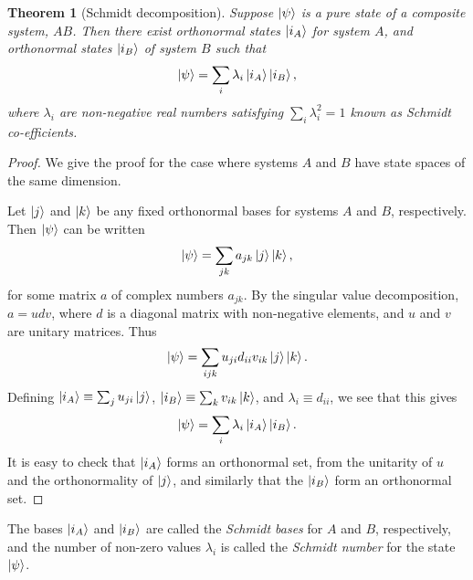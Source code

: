 \documentclass{article}
\newtheorem{theorem}{Theorem}
\numberwithin{theorem}{section}
\numberwithin{corollary}{section}
\numberwithin{postulate}{section}
\begin{document}
\begin{theorem}[Schmidt decomposition]
  Suppose $\ket{\psi}$ is a pure state of a composite system, $AB$. Then there
  exist orthonormal states $\ket{i_A}$ for system $A$, and orthonormal states
  $\ket{i_B}$ of system $B$ such that \[
    \ket{\psi} = \sum_i \lambda_i\ket{i_A}\ket{i_B},
  \] where $\lambda_i$ are non-negative real numbers satisfying $\sum_i
  \lambda_i^2 = 1$ known as \emph{Schmidt co-efficients}.
\end{theorem}
\begin{proof}
  We give the proof for the case where systems $A$ and $B$ have state spaces of
  the same dimension.

  Let $\ket{j}$ and $\ket{k}$ be any fixed orthonormal bases for systems $A$ and
  $B$, respectively. Then $\ket{\psi}$ can be written \[
    \ket{\psi} = \sum_{jk} a_{jk}\ket{j}\ket{k},
  \] for some matrix $a$ of complex numbers $a_{jk}$. By the singular value
  decomposition, $a = udv$, where $d$ is a diagonal matrix with non-negative
  elements, and $u$ and $v$ are unitary matrices. Thus \[
    \ket{\psi} = \sum_{ijk} u_{ji}d_{ii}v_{ik}\ket{j}\ket{k}.
  \] Defining $\ket{i_A} \equiv \sum_j u_{ji}\ket{j}$, $\ket{i_B} \equiv \sum_k
  v_{ik}\ket{k}$, and $\lambda_i \equiv d_{ii}$, we see that this gives \[
    \ket{\psi} = \sum_i \lambda_i\ket{i_A}\ket{i_B}.
  \] It is easy to check that $\ket{i_A}$ forms an orthonormal set, from the
  unitarity of $u$ and the orthonormality of $\ket{j}$, and similarly that the
  $\ket{i_B}$ form an orthonormal set.
\end{proof}

The bases $\ket{i_A}$ and $\ket{i_B}$ are called the \emph{Schmidt bases} for
$A$ and $B$, respectively, and the number of non-zero values $\lambda_i$ is
called the \emph{Schmidt number} for the state $\ket{\psi}$.
\end{document}

